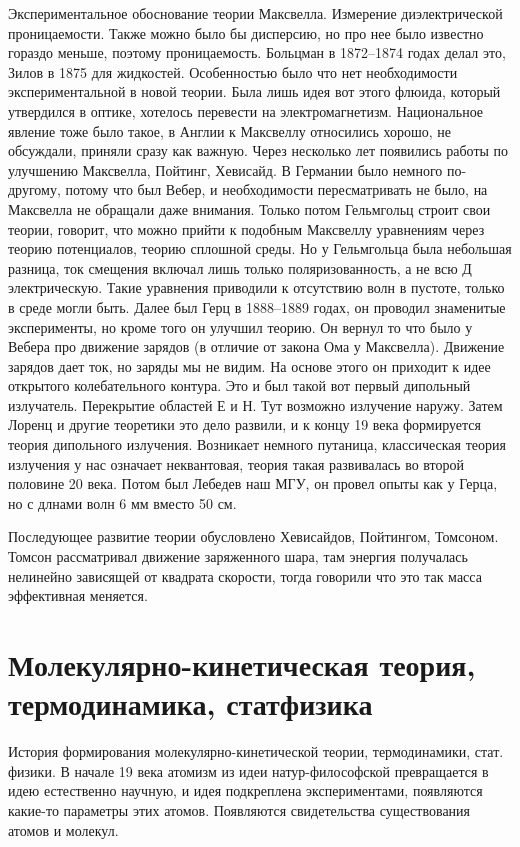 \documentclass[a4paper, 12pt]{article}
\begin{document}
Экспериментальное обоснование теории Максвелла. Измерение 
диэлектрической проницаемости. Также можно было бы дисперсию, но про нее 
было известно гораздо меньше, поэтому проницаемость. Больцман 
в 1872--1874 годах делал это, Зилов в 1875 для жидкостей. Особенностью 
было что нет необходимости экспериментальной в новой теории. Была лишь 
идея вот этого флюида, который утвердился в оптике, хотелось перевести 
на электромагнетизм. Национальное явление тоже было такое, в Англии 
к Максвеллу относились хорошо, не обсуждали, приняли сразу как важную. 
Через несколько лет появились работы по улучшению Максвелла, Пойтинг, 
Хевисайд. В Германии было немного по-другому, потому что был Вебер, 
и необходимости пересматривать не было, на Максвелла не обращали даже 
внимания. Только потом Гельмгольц строит свои теории, говорит, что можно 
прийти к подобным Максвеллу уравнениям через теорию потенциалов, теорию 
сплошной среды. Но у Гельмгольца была небольшая разница, ток смещения 
включал лишь только поляризованность, а не всю Д электрическую. Такие 
уравнения приводили к отсутствию волн в пустоте, только в среде могли 
быть. Далее был Герц в 1888--1889 годах, он проводил знаменитые 
эксперименты, но кроме того он улучшил теорию. Он вернул то что было 
у Вебера про движение зарядов (в отличие от закона Ома у Максвелла). 
Движение зарядов дает ток, но заряды мы не видим. На основе этого он 
приходит к идее открытого колебательного контура. Это и был такой вот 
первый дипольный излучатель. Перекрытие областей Е и Н. Тут возможно 
излучение наружу. Затем Лоренц и другие теоретики это дело развили, 
и к концу 19 века формируется теория дипольного излучения. Возникает 
немного путаница, классическая теория излучения у нас означает 
неквантовая, теория такая развивалась во второй половине 20 века. Потом 
был Лебедев наш МГУ, он провел опыты как у Герца, но с длнами волн 6 мм 
вместо 50 см.

Последующее развитие теории обусловлено Хевисайдов, Пойтингом, Томсоном. 
Томсон рассматривал движение заряженного шара, там энергия получалась 
нелинейно зависящей от квадрата скорости, тогда говорили что это так 
масса эффективная меняется.


\section{Молекулярно-кинетическая теория, термодинамика, статфизика}

История формирования молекулярно-кинетической теории, термодинамики, 
стат. физики. В начале 19 века атомизм из идеи натур-философской 
превращается в идею естественно научную, и идея подкреплена 
экспериментами, появляются какие-то параметры этих атомов. Появляются 
свидетельства существования атомов и молекул.
\end{document}
